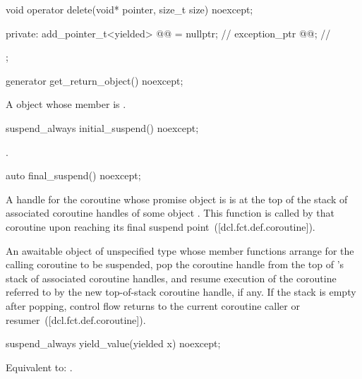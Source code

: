 \documentclass{wg21}
\begin{document}
\begin{addedblock}
\begin{codeblock}
{{    void operator delete(void* pointer, size_t size) noexcept;

  private:
    add_pointer_t<yielded> @@ = nullptr; // \expos
    exception_ptr @@; // \expos
  };
}
\end{codeblock}

\begin{itemdecl}
generator get_return_object() noexcept;
\end{itemdecl}

\begin{itemdescr}
\returns
A  object whose member 
is .
\end{itemdescr}

\begin{itemdecl}
suspend_always initial_suspend() noexcept;
\end{itemdecl}

\begin{itemdescr}
\returns \tcode{\{\}}.
\end{itemdescr}

\begin{itemdecl}
auto final_suspend() noexcept;
\end{itemdecl}

\begin{itemdescr}
\expects
A handle for the coroutine whose promise object is 
is at the top of the stack of associated coroutine handles
of some  object .
This function is called by that coroutine
upon reaching its final suspend point~([dcl.fct.def.coroutine]).

\returns
An awaitable object of unspecified type
whose member functions arrange for the
calling coroutine to be suspended,
pop the coroutine handle
from the top of 's stack of associated coroutine handles,
and resume execution of the coroutine referred to by
the new top-of-stack coroutine handle, if any.
If the stack is empty after popping,
control flow returns to the
current coroutine caller or resumer~([dcl.fct.def.coroutine]).
\end{itemdescr}

\begin{itemdecl}
suspend_always yield_value(yielded x) noexcept;
\end{itemdecl}

\begin{itemdescr}
\effects
Equivalent to:
.


\end{itemdescr}
\end{addedblock}
\end{document}
